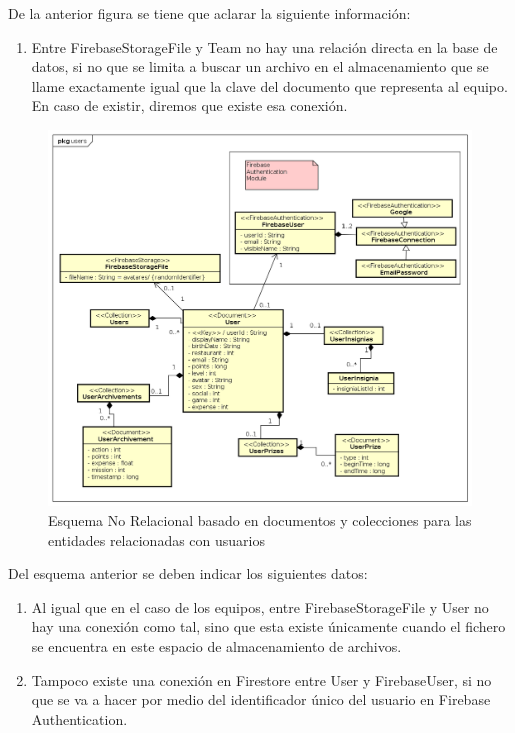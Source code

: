 \documentclass[twoside]{report}
\begin{document}
De la anterior figura se tiene que aclarar la siguiente información:

\begin{enumerate}

\item Entre FirebaseStorageFile y Team no hay una relación directa en la base de datos, si no que se limita a buscar un archivo en el almacenamiento que se llame exactamente igual que la clave del documento que representa al equipo. En caso de existir, diremos que existe esa conexión.

\end{enumerate}

\begin{figure}[H]
\centering
\includegraphics[scale=0.5]{images/databaseNRusers}
\caption{Esquema No Relacional basado en documentos y colecciones para las entidades relacionadas con usuarios}
\end{figure}

Del esquema anterior se deben indicar los siguientes datos:
\begin{enumerate}

\item Al igual que en el caso de los equipos, entre FirebaseStorageFile y User no hay una conexión como tal, sino que esta existe únicamente cuando el fichero se encuentra en este espacio de almacenamiento de archivos.
\item Tampoco existe una conexión en Firestore entre User y FirebaseUser, si no que se va a hacer por medio del identificador único del usuario en Firebase Authentication.

\end{enumerate}
\end{document}

